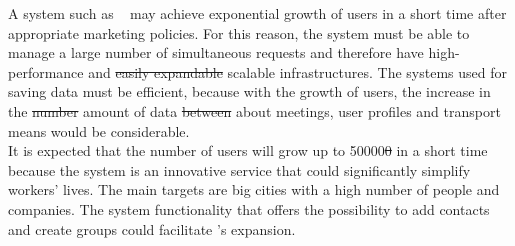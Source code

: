A system such as \projectname~ may achieve exponential growth of users in a short time after appropriate marketing policies. For this reason, the system must be able to manage a large number of simultaneous requests and therefore have high-performance and \st{easily expandable} scalable infrastructures. The systems used for saving data must be efficient, because with the growth of users, the increase in the \st{number} amount of data \st{between} about meetings, user profiles and transport means would be considerable.\\
It is expected that the number of users will grow up to 50000\st{0} in a short time because the system is an innovative service that could significantly simplify workers' lives. The main targets are big cities with a high number of people and companies. The system functionality that offers the possibility to add contacts and create groups could facilitate \projectname's expansion.